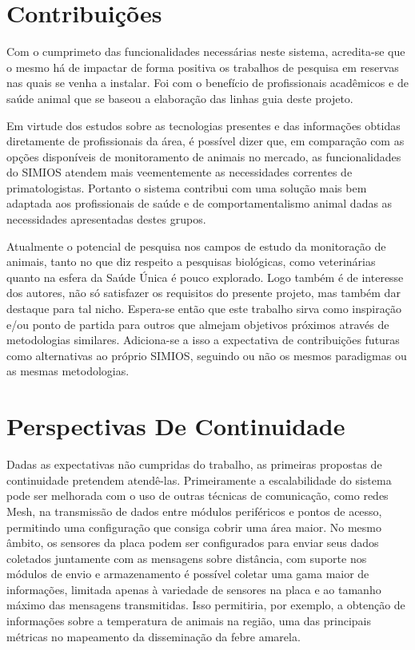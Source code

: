 \section{Contribuições}

Com o cumprimeto das funcionalidades necessárias neste sistema, acredita-se que o mesmo há de impactar de forma positiva os trabalhos de pesquisa em reservas nas quais se venha a instalar. Foi com o benefício de profissionais acadêmicos e de saúde animal que se baseou a elaboração das linhas guia deste projeto.

Em virtude dos estudos sobre as tecnologias presentes e das informações obtidas diretamente de profissionais da área, é possível dizer que, em comparação com as opções disponíveis de monitoramento de animais no mercado, as funcionalidades do SIMIOS atendem mais veementemente as necessidades correntes de primatologistas. Portanto o sistema contribui com uma solução mais bem adaptada aos profissionais de saúde e de comportamentalismo animal dadas as necessidades apresentadas destes grupos.

Atualmente o potencial de pesquisa nos campos de estudo da monitoração de animais, tanto no que diz respeito a pesquisas biológicas, como veterinárias quanto na esfera da Saúde Única é pouco explorado. Logo também é de interesse dos autores, não só satisfazer os requisitos do presente projeto, mas também dar destaque para tal nicho. Espera-se então que este trabalho sirva como inspiração e/ou ponto de partida para outros que almejam objetivos próximos através de metodologias similares. Adiciona-se a isso a expectativa de contribuições futuras como alternativas ao próprio SIMIOS, seguindo ou não os mesmos paradigmas ou as mesmas metodologias.

\section{Perspectivas De Continuidade}

Dadas as expectativas não cumpridas do trabalho, as primeiras propostas de continuidade pretendem atendê-las. Primeiramente a escalabilidade do sistema pode ser melhorada com o uso de outras técnicas de comunicação, como redes Mesh, na transmissão de dados entre módulos periféricos e pontos de acesso, permitindo uma configuração que consiga cobrir uma área maior. No mesmo âmbito, os sensores da placa podem ser configurados para enviar seus dados coletados juntamente com as mensagens sobre distância, com suporte nos módulos de envio e armazenamento é possível coletar uma gama maior de informações, limitada apenas à variedade de sensores na placa e ao tamanho máximo das mensagens transmitidas. Isso permitiria, por exemplo, a obtenção de informações sobre a temperatura de animais na região, uma das principais métricas no mapeamento da disseminação da febre amarela.

